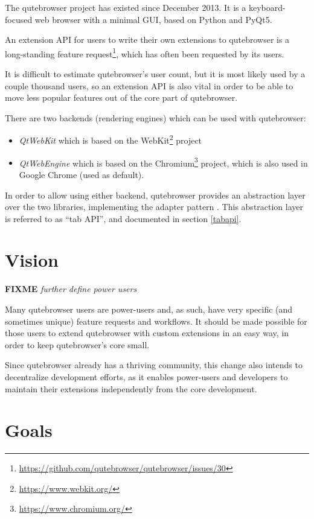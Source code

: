 \documentclass[a4paper,parskip=full]{scrreprt}
\newcommand{\fixme}[1]{\textbf{FIXME} \emph{#1}}
\begin{document}
The qutebrowser project has existed since December 2013. It is a keyboard-focused
web browser with a minimal GUI, based on Python and PyQt5.

An extension API for users to write their own extensions to qutebrowser is a
long-standing feature
request\footnote{\url{https://github.com/qutebrowser/qutebrowser/issues/30}},
which has often been requested by its users.

It is difficult to estimate qutebrowser's user count, but it is most likely used by a
couple thousand users, so an extension API is also vital in order to be able to move
less popular features out of the core part of qutebrowser.

\label{backends}
There are two backends (rendering engines) which can be used with qutebrowser:

\begin{itemize}
  \item \emph{QtWebKit} which is based on the
  WebKit\footnote{\url{https://www.webkit.org/}} project
  \item \emph{QtWebEngine} which is based on the
  Chromium\footnote{\url{https://www.chromium.org/}} project, which is also used
  in Google Chrome (used as default).
\end{itemize}

In order to allow using either backend, qutebrowser provides an abstraction
layer over the two libraries, implementing the adapter pattern
\citep[p.~139ff]{gof}. This abstraction layer is referred to as ``tab API'', and
documented in section \ref{tabapi}.

\section{Vision}
\label{vision}

\fixme{further define power users}

Many qutebrowser users are power-users and, as such, have very specific (and
sometimes unique) feature requests and workflows. It should be made possible for
those users to extend qutebrowser with custom extensions in an easy way, in order
to keep qutebrowser's core small.

Since qutebrowser already has a thriving community, this change also intends to
decentralize development efforts, as it enables power-users and
developers to maintain their extensions independently from the core development.

\section{Goals}
\label{goals}
\end{document}

